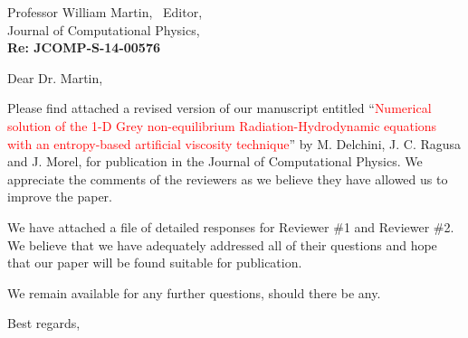 \documentclass[11pt]{letter}
\newcommand{\tcr}[1]{\textcolor{red}{#1}}
\begin{document}
\begin{letter}{Professor William Martin, \  Editor,\\
    Journal of Computational Physics,\\
\textbf{Re: JCOMP-S-14-00576}}


\date{\today}

\opening{Dear Dr. Martin,}
         \vspace{0.25cm}

Please find attached a revised version of our manuscript entitled
``\tcr{Numerical solution of the 1-D Grey non-equilibrium Radiation-Hydrodynamic equations with an entropy-based artificial viscosity technique}''
by M. Delchini, J. C. Ragusa and J. Morel, for
publication in the Journal of Computational Physics. We appreciate the comments of the reviewers as we
believe they have allowed us to improve the paper.

We have attached a file of detailed responses for Reviewer \#1 and Reviewer \#2.
We believe that we have adequately addressed all of their questions and hope that our paper will be found suitable for publication.

%
%
\bigskip

We remain available for any further questions, should there be any.
\vspace{0.25cm}



\closing{Best regards, }

\end{letter}
\end{document}

